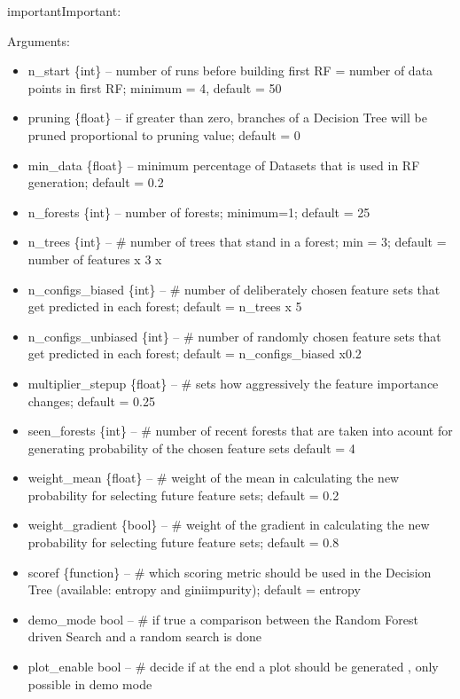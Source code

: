 \documentclass[letterpaper,10pt,english]{sphinxmanual}
\begin{document}
\begin{sphinxadmonition}{important}{Important:}
\begin{fulllineitems}
Arguments:
\begin{itemize}
\item {} 
n\_start \{int\} -- number of runs before building first RF = number of data points in first RF; minimum = 4, default = 50

\item {} 
pruning \{float\} -- if greater than zero, branches of a Decision Tree will be pruned proportional to pruning value; default = 0

\item {} 
min\_data \{float\} -- minimum percentage of Datasets that is used in RF generation; default = 0.2

\item {} 
n\_forests \{int\} -- number of forests; minimum=1;  default = 25

\item {} 
n\_trees \{int\} -- \# number of trees that stand in a forest; min = 3; default = number of features x 3 x

\item {} 
n\_configs\_biased \{int\} -- \# number of deliberately chosen feature sets that get predicted in each forest; default = n\_trees x 5

\item {} 
n\_configs\_unbiased \{int\} -- \# number of randomly chosen feature sets that get predicted in each forest; default = n\_configs\_biased x0.2

\item {} 
multiplier\_stepup \{float\} -- \# sets how aggressively the feature importance changes; default = 0.25

\item {} 
seen\_forests \{int\} -- \# number of recent forests that are taken into acount for generating probability of the chosen feature sets default = 4

\item {} 
weight\_mean \{float\} -- \# weight of the mean in calculating the new probability for selecting future feature sets; default = 0.2

\item {} 
weight\_gradient \{bool\} -- \# weight of the gradient in calculating the new probability for selecting future feature sets; default = 0.8

\item {} 
scoref \{function\} -- \# which scoring metric should be used in the Decision Tree (available: entropy and giniimpurity); default = entropy

\item {} 
demo\_mode bool -- \# if true a comparison between the Random Forest driven Search and a random search is done

\item {} 
plot\_enable bool -- \# decide if at the end a plot should be generated , only possible in demo mode

\end{itemize}

\end{fulllineitems}

\end{sphinxadmonition}
\end{document}
